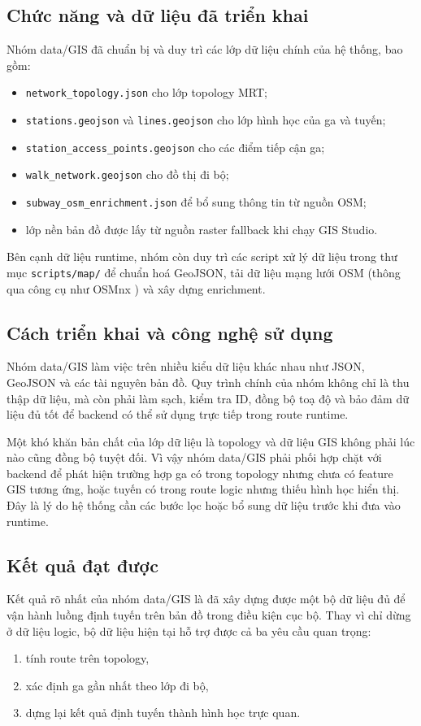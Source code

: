 ﻿\documentclass[../DoAn.tex]{subfiles}
\begin{document}
\subsection{Chức năng và dữ liệu đã triển khai}
Nhóm data/GIS đã chuẩn bị và duy trì các lớp dữ liệu chính của hệ thống, bao gồm:
\begin{itemize}
    \item \texttt{network\_topology.json} cho lớp topology MRT;
    \item \texttt{stations.geojson} và \texttt{lines.geojson} cho lớp hình học của ga và tuyến;
    \item \texttt{station\_access\_points.geojson} cho các điểm tiếp cận ga;
    \item \texttt{walk\_network.geojson} cho đồ thị đi bộ;
    \item \texttt{subway\_osm\_enrichment.json} để bổ sung thông tin từ nguồn OSM;
    \item lớp nền bản đồ được lấy từ nguồn raster fallback khi chạy GIS Studio.
\end{itemize}

Bên cạnh dữ liệu runtime, nhóm còn duy trì các script xử lý dữ liệu trong thư mục \texttt{scripts/map/} để chuẩn hoá GeoJSON, tải dữ liệu mạng lưới OSM \cite{osm} (thông qua công cụ như OSMnx \cite{osmnx}) và xây dựng enrichment.

\subsection{Cách triển khai và công nghệ sử dụng}
Nhóm data/GIS làm việc trên nhiều kiểu dữ liệu khác nhau như JSON, GeoJSON và các tài nguyên bản đồ. Quy trình chính của nhóm không chỉ là thu thập dữ liệu, mà còn phải làm sạch, kiểm tra ID, đồng bộ toạ độ và bảo đảm dữ liệu đủ tốt để backend có thể sử dụng trực tiếp trong route runtime.

Một khó khăn bản chất của lớp dữ liệu là topology và dữ liệu GIS không phải lúc nào cũng đồng bộ tuyệt đối. Vì vậy nhóm data/GIS phải phối hợp chặt với backend để phát hiện trường hợp ga có trong topology nhưng chưa có feature GIS tương ứng, hoặc tuyến có trong route logic nhưng thiếu hình học hiển thị. Đây là lý do hệ thống cần các bước lọc hoặc bổ sung dữ liệu trước khi đưa vào runtime.

\subsection{Kết quả đạt được}
Kết quả rõ nhất của nhóm data/GIS là đã xây dựng được một bộ dữ liệu đủ để vận hành luồng định tuyến trên bản đồ trong điều kiện cục bộ. Thay vì chỉ dừng ở dữ liệu logic, bộ dữ liệu hiện tại hỗ trợ được cả ba yêu cầu quan trọng:
\begin{enumerate}
    \item tính route trên topology,
    \item xác định ga gần nhất theo lớp đi bộ,
    \item dựng lại kết quả định tuyến thành hình học trực quan.
\end{enumerate}
\end{document}
